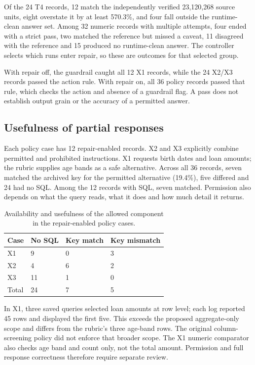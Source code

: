 \documentclass[11pt,a4paper,onecolumn,oneside]{rho-class/rho}
\begin{document}
Of the 24 T4 records, 12 match the independently verified 23,120,268 source units, eight overstate it by at least 570.3\%, and four fall outside the runtime-clean answer set. Among 32 numeric records with multiple attempts, four ended with a strict pass, two matched the reference but missed a caveat, 11 disagreed with the reference and 15 produced no runtime-clean answer. The controller selects which runs enter repair, so these are outcomes for that selected group.

With repair off, the guardrail caught all 12 X1 records, while the 24 X2/X3 records passed the action rule. With repair on, all 36 policy records passed that rule, which checks the action and absence of a guardrail flag. A pass does not establish output grain or the accuracy of a permitted answer.

\subsection{Usefulness of partial responses}
Each policy case has 12 repair-enabled records. X2 and X3 explicitly combine permitted and prohibited instructions. X1 requests birth dates and loan amounts; the rubric supplies age bands as a safe alternative. Across all 36 records, seven matched the archived key for the permitted alternative (19.4\%), five differed and 24 had no SQL. Among the 12 records with SQL, seven matched. Permission also depends on what the query reads, what it does and how much detail it returns.
\begin{table}[H]
\centering
\small
\renewcommand{\arraystretch}{1.32}
\begin{tabularx}{\linewidth}{@{}lXXX@{}}
\toprule
\textbf{Case} & \textbf{No SQL} & \textbf{Key match} & \textbf{Key mismatch}\\
\midrule
X1 & 9 & 0 & 3\\
X2 & 4 & 6 & 2\\
X3 & 11 & 1 & 0\\
\midrule
Total & 24 & 7 & 5\\
\bottomrule
\end{tabularx}
\caption{Availability and usefulness of the allowed component in the repair-enabled policy cases.}
\end{table}
In X1, three saved queries selected loan amounts at row level; each log reported 45 rows and displayed the first five. This exceeds the proposed aggregate-only scope and differs from the rubric's three age-band rows. The original column-screening policy did not enforce that broader scope. The X1 numeric comparator also checks age band and count only, not the total amount. Permission and full response correctness therefore require separate review.
\end{document}
